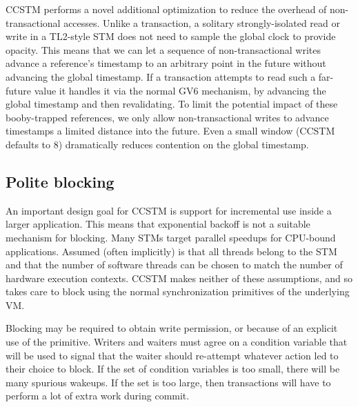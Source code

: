 CCSTM performs a novel additional optimization to reduce the overhead
of non-transactional accesses.  Unlike a transaction, a solitary
strongly-isolated read or write in a TL2-style STM does not need to
sample the global clock to provide opacity.  This means that we can let
a sequence of non-transactional writes advance a reference's timestamp to
an arbitrary point in the future without advancing the global timestamp.
If a transaction attempts to read such a far-future value it handles
it via the normal GV6 mechanism, by advancing the global timestamp and
then revalidating.  To limit the potential impact of these booby-trapped
references, we only allow non-transactional writes to advance timestamps
a limited distance into the future.  Even a small window (CCSTM defaults
to 8) dramatically reduces contention on the global timestamp.

\subsection{Polite blocking}

An important design goal for CCSTM is support for incremental use inside
a larger application.  This means that exponential backoff is not a
suitable mechanism for blocking.  Many STMs target parallel speedups
for CPU-bound applications.  Assumed (often implicitly) is that all
threads belong to the STM and that the number of software threads can be
chosen to match the number of hardware execution contexts.  CCSTM makes
neither of these assumptions, and so takes care to block using the normal
synchronization primitives of the underlying VM.

Blocking may be required to obtain write permission, or because of an
explicit use of the  primitive.  Writers and waiters must
agree on a condition variable that will be used to signal that the
waiter should re-attempt whatever action led to their choice to block.
If the set of condition variables is too small, there will be many
spurious wakeups.  If the set is too large, then transactions will have
to perform a lot of extra work during commit.

